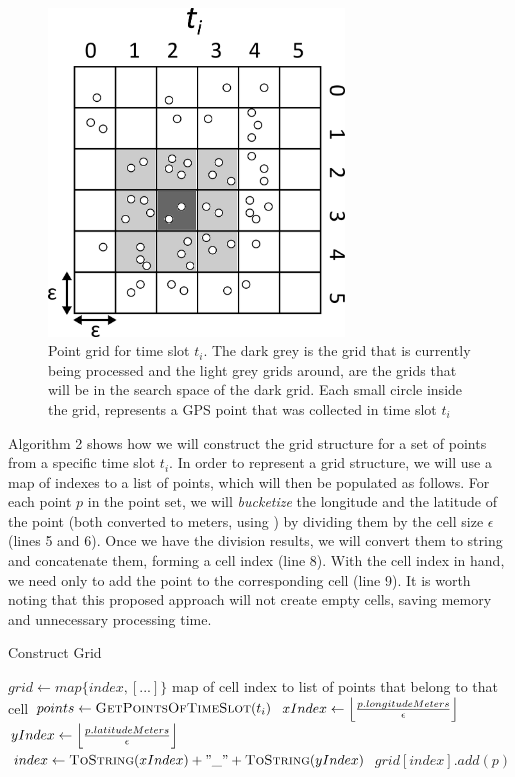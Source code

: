 \begin{figure}[h!]
    \centering
    \includegraphics[width=0.7\textwidth]{images/grid.png}
    \caption{Point grid for time slot $t_i$. The dark grey is the grid that is currently being processed and the light
        grey grids around, are the grids that will be in the search space of the dark grid. Each small circle inside the
        grid, represents a GPS point that was collected in time slot $t_i$}
    \label{fig:grid}
\end{figure}

Algorithm 2 shows how we will construct the grid structure for a set of points from a specific time slot $t_i$. In order
to represent a grid structure, we will use a map of indexes to a list of points, which will then be populated as
follows. For each point $p$ in the point set, we will \textit{bucketize} the longitude and the latitude of the point
(both converted to meters, using ) by dividing them by the cell size $\epsilon$ (lines 5 and 6).
Once we have the division results, we will convert them to string and concatenate them, forming a cell index (line 8).
With the cell index in hand, we need only to add the point to the corresponding cell (line 9). It is worth noting that
this proposed approach will not create empty cells, saving memory and unnecessary processing time.

\begin{algorithm}
\caption{Construct Grid}
\begin{algorithmic}[1]
    \State $grid \gets map\{index, [...]\}$ \Comment map of cell index to list of points that belong to that cell
    \State $points \gets \Call{GetPointsOfTimeSlot}{t_i}$
    \State
        \State $xIndex \gets \floor*{\frac{p.longitudeMeters}{\epsilon}}$
        \State $yIndex \gets \floor*{\frac{p.latitudeMeters}{\epsilon}}$
        \State
        \State $index \gets \Call{ToString}{xIndex} + "\_" + \Call{ToString}{yIndex}$
        \State $grid[index].add(p)$
    \EndFor
\end{algorithmic}
\end{algorithm}
